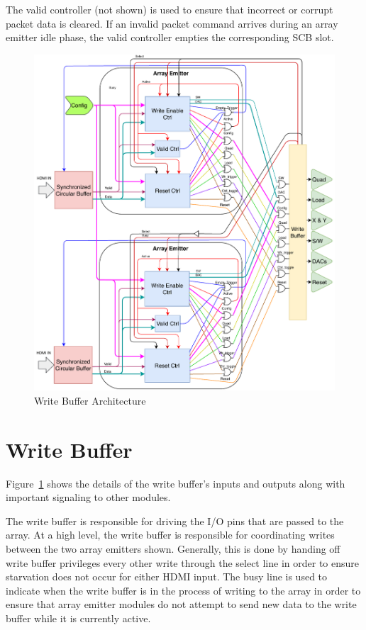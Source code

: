     The valid controller (not shown) is used to ensure that incorrect or corrupt packet data is cleared. If an invalid packet command arrives during an array emitter idle phase, the valid controller empties the corresponding SCB slot.

    \begin{figure}
        \centering
        \includegraphics[width=1.0\textwidth]{fig/pdp_wb_arch.pdf}
        \caption{Write Buffer Architecture}
        \label{fig:wb_arch}
    \end{figure}

\section{Write Buffer}

    Figure~\ref{fig:wb_arch} shows the details of the write buffer's inputs and outputs along with important signaling to other modules.

    The write buffer is responsible for driving the I/O pins that are passed to the array. At a high level, the write buffer is responsible for coordinating writes between the two array emitters shown. Generally, this is done by handing off write buffer privileges every other write through the select line in order to ensure starvation does not occur for either HDMI input. The busy line is used to indicate when the write buffer is in the process of writing to the array in order to ensure that array emitter modules do not attempt to send new data to the write buffer while it is currently active.

